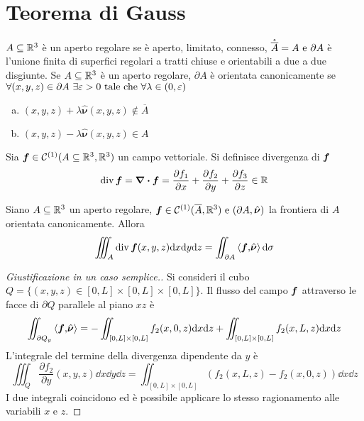 \section{Teorema di Gauss}

\begin{definition}
	$A\subseteq \mathbb{R}^3$ è un aperto regolare se è aperto, limitato, connesso, $\mathring{\overline A}=A \text{ e } \partial A$ è l'unione finita di superfici regolari a tratti chiuse e orientabili a due a due disgiunte. Se $A \subseteq \mathbb{R}^3$ è un aperto regolare, $\partial A$ è orientata canonicamente se $\forall (x,y,z) \in \partial A \ \exists \varepsilon > 0 \text{ tale che } \forall \lambda \in (0,\varepsilon)$
	\begin{enumerate}[a.]
		\item $(x,y,z) + \lambda \hat{\bm \nu}(x,y,z) \notin \overline{A}$
		\item $(x,y,z) - \lambda \hat{\bm \nu}(x,y,z) \in A$
	\end{enumerate}
\end{definition}

\begin{definition}
	[Divergenza]
	Sia $\bm f \in \mathcal{C}^{(1)}(A\subseteq\mathbb{R}^3,\mathbb{R}^3)$ un campo vettoriale. Si definisce divergenza di $\bm f$
	$$
		\divop \vecf=\divergence \vecf=\frac{\partial f_1}{\partial x} + \frac{\partial f_2}{\partial y} + \frac{\partial f_3}{\partial z} \in \R
	$$
\end{definition}

\begin{theorem}
	Siano $A\subseteq \mathbb{R}^3$ un aperto regolare, $\bm f \in \mathcal{C}^{(1)}(\overline{A},\mathbb{R}^3) \text{ e } (\partial A, \hat{\bm \nu})$ la frontiera di $A$ orientata canonicamente. Allora
	$$
		\iiint_A \operatorname{div} \bm f(x,y,z)\dd x \dd y \dd z = \iint_{\partial A}\left\langle\bm f{,}\hat{\bm \nu}\right\rangle\dd \sigma
	$$
\end{theorem}

\begin{proof}
	[Giustificazione in un caso semplice.]
	Si consideri il cubo $Q=\{(x,y,z)\in[0,L]\times[0,L]\times[0,L]\}$. Il flusso del campo $\bm f$ attraverso le facce di $\partial Q$ parallele al piano $xz$ è
	$$
		\iint_{\partial Q_y}\left\langle\bm f{,}\hat{\bm\nu}\right\rangle=-\iint_{[0,L]\times[0,L]}f_2(x,0,z)\dd x \dd z
		+\iint_{[0,L]\times[0,L]}f_2(x,L,z)\dd x \dd z
	$$
	L'integrale del termine della divergenza dipendente da $y$ è
	$$
		\iiint_{Q}\frac{\partial f_2}{\partial y}(x,y,z)\dd x \dd y \dd z=\iint_{[0,L]\times[0,L]}(f_2(x,L,z)-f_2(x,0,z))\dd x \dd z
	$$
	I due integrali coincidono ed è possibile applicare lo stesso ragionamento alle variabili $x$ e $z$.
\end{proof}

